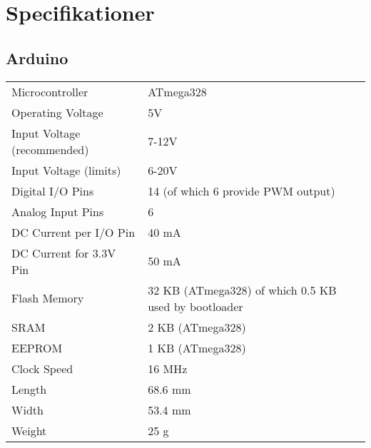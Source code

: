 \section{Specifikationer} %
\label{sec:specifikationer}

    \subsection{Arduino} %
    \label{sub:arduino_spec}
        \begin{tabularx}{\textwidth}{@{}lX}

            Microcontroller & ATmega328 \\
            Operating Voltage &  5V \\
            Input Voltage (recommended) & 7-12V \\
            Input Voltage (limits) & 6-20V \\
            Digital I/O Pins  &  14 (of which 6 provide PWM output) \\
            Analog Input Pins  & 6 \\
            DC Current per I/O Pin  & 40 mA \\
            DC Current for 3.3V Pin & 50 mA \\
            Flash Memory  &  32 KB (ATmega328) of which 0.5 KB used by bootloader \\
            SRAM  &  2 KB (ATmega328) \\
            EEPROM & 1 KB (ATmega328) \\
            Clock Speed & 16 MHz \\
            Length & 68.6 mm \\
            Width  & 53.4 mm \\
            Weight & 25 g     \\
        \end{tabularx}



